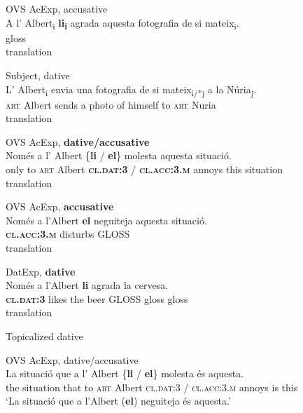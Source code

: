 \documentclass[output=paper,modfonts,nonflat,newtxmath]{langsci/langscibook}
\begin{document}
 \ex OVS AcExp, {accusative}\label{ex:royo:8c}\\
 \gll A l’ Albert\textsubscript{i} \textbf{li\textsubscript{i}} agrada aquesta fotografia de si mateix\textsubscript{i}.\\
gloss\\
 \glt translation
 
  \ex Subject, dative\label{ex:royo:8c}\\
 \gll L’ Albert\textsubscript{i} envia una fotografia de si mateix\textsubscript{i/*j} a la Núria\textsubscript{j}.\\
 \textsc{art} Albert sends a photo of himself to \textsc{art} Nuria\\
 \glt translation
 
 \z
 \z

\ea%
 \label{ex:royo:9}
 \ea OVS AcExp, \textbf{dative/accusative} \label{ex:royo:9a}\\
 \gll Només a l’ Albert \{\textbf{li} / \textbf{el}\} molesta aquesta situació. \\
 only to \textsc{art} Albert \textbf{\textsc{cl.dat:3}} / \textbf{\textsc{cl.acc:3.m}} annoys this situation \\
 \glt translation
 
 \ex OVS AcExp, \textbf{accusative} \label{ex:royo:9b}\\
 \gll Només a l’Albert \textbf{el} neguiteja aquesta situació.\\
  \textbf{\textsc{cl.acc:3.m}} disturbs GLOSS \\
 \glt  translation
 
  \ex DatExp, \textbf{dative} \label{ex:royo:9c}\\
 \gll   Només a l’Albert \textbf{li} agrada la cervesa. \\
 \textbf{\textsc{cl.dat:3}} likes the beer GLOSS gloss gloss \\
 \glt translation
 
 \ex Topicalized dative \label{ex:royo:9d}\\
 
 \z
 \z
 

\ea%
 \label{ex:royo:10}
 \ea  OVS AcExp, {dative/accusative} \label{ex:royo:10a}\\
 \gll  La situació que a l’ Albert \{\textbf{li} / \textbf{el}\} molesta és aquesta.\\
	 the situation that to \textsc{art} Albert \textsc{cl.dat:3} / \textsc{cl.acc:3.m} annoys is this \\
 \glt `La situació que a l’Albert (\textbf{el}) neguiteja és aquesta.'
 
\end{document}
